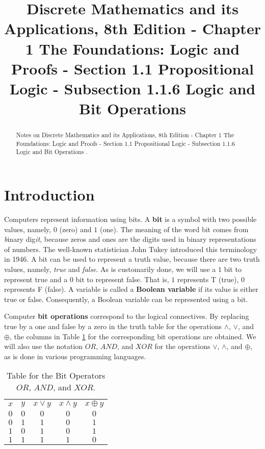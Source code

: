 \documentclass{Axon}
\title{Discrete Mathematics and its Applications, 8th Edition - Chapter 1 The Foundations: Logic and Proofs - Section 1.1 Propositional Logic - Subsection 1.1.6 Logic and Bit Operations}
\begin{document}
\maketitle
\makeauthor
\begin{abstract}
Notes on Discrete Mathematics and its Applications, 8th Edition - Chapter 1 The Foundations: Logic and Proofs - Section 1.1 Propositional Logic - Subsection 1.1.6 Logic and Bit Operations \cite{Rosen}.
\end{abstract}
\section{Introduction}
Computers represent information using bits. A \textbf{bit} is a symbol with two possible values, namely, \(0\) (zero) and \(1\) (one). The meaning of the word bit comes from \textit{b}inary dig\textit{it}, because zeros and ones are the digits used in binary representations of numbers. The well-known statistician John Tukey introduced this terminology in 1946. A bit can be used to represent a truth value, because there are two truth values, namely, \textit{true} and \textit{false}. As is customarily done, we will use a \(1\) bit to represent true and a \(0\) bit to represent false. That is, \(1\) represents T (true), \(0\) represents F (false). A variable is called a \textbf{Boolean variable} if its value is either true or false. Consequently, a Boolean variable can be represented using a bit.

Computer \textbf{bit operations} correspond to the logical connectives. By replacing true by a one and false by a zero in the truth table for the operations \(\land\), \(\lor\), and \(\oplus\), the columns in Table \ref{Table: 9} for the corresponding bit operations are obtained. We will also use the notation \(OR\), \(AND\), and \(XOR\) for the operations \(\lor\), \(\land\), and \(\oplus\), as is done in various programming languages.

\begin{table}[h]
    \centering
    \begin{tabular}{c|c|c|c|c}
        \(x\) & \(y\) & \(x \lor y\) & \(x \land y\) & \(x \oplus y\) \\
        \(0\) & \(0\) & \(0\)        & \(0\)         & \(0\)          \\
        \(0\) & \(1\) & \(1\)        & \(0\)         & \(1\)          \\
        \(1\) & \(0\) & \(1\)        & \(0\)         & \(1\)          \\
        \(1\) & \(1\) & \(1\)        & \(1\)         & \(0\)
    \end{tabular}
    \caption{Table for the Bit Operators \(OR\), \(AND\), and \(XOR\).}
    \label{Table: 9}
\end{table}
\end{document}

